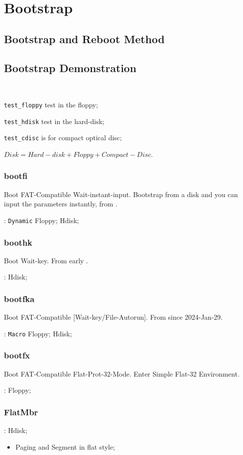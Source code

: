 
\section{Bootstrap}

\subsection{Bootstrap and Reboot Method}


\subsection{Bootstrap Demonstration} \

\verb`test_floppy` test in the floppy;

\verb`test_hdisk` test in the hard-disk;

\verb`test_cdisc` is  for compact optical disc;

$Disk = Hard-disk + Floppy + Compact-Disc$.

\subsubsection{bootfi}

Boot FAT-Compatible Wait-instant-input. Bootstrap from a disk and you can input the parameters instantly, from .

: \verb|Dynamic| Floppy; Hdisk;

\subsubsection{boothk} %

Boot Wait-key. From early .

: Hdisk;

\subsubsection{bootfka}

Boot FAT-Compatible [Wait-key/File-Autorun]. From  since 2024-Jan-29.

: \verb`Macro` Floppy; Hdisk;

\subsubsection{bootfx}

Boot FAT-Compatible Flat-Prot-32-Mode. Enter Simple Flat-32 Environment.

: Floppy;

\subsubsection{FlatMbr}%


: Hdisk;

\begin{itemize}
	\item Paging and Segment in flat style;
\end{itemize}
